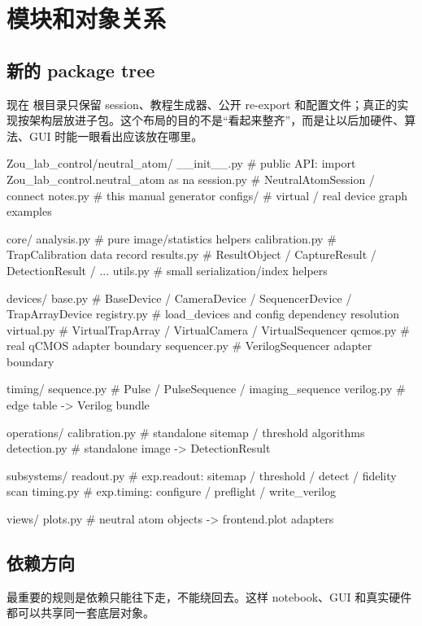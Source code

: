\documentclass[11pt,oneside,openany]{book}
\begin{document}
\chapter{模块和对象关系}
\section{新的 package tree}
现在  根目录只保留 session、教程生成器、公开 re-export 和配置文件；真正的实现按架构层放进子包。这个布局的目的不是“看起来整齐”，而是让以后加硬件、算法、GUI 时能一眼看出应该放在哪里。

\begin{codeblock}
Zou_lab_control/neutral_atom/
  __init__.py              # public API: import Zou_lab_control.neutral_atom as na
  session.py               # NeutralAtomSession / connect
  notes.py                 # this manual generator
  configs/                 # virtual / real device graph examples

  core/
    analysis.py            # pure image/statistics helpers
    calibration.py         # TrapCalibration data record
    results.py             # ResultObject / CaptureResult / DetectionResult / ...
    utils.py               # small serialization/index helpers

  devices/
    base.py                # BaseDevice / CameraDevice / SequencerDevice / TrapArrayDevice
    registry.py            # load_devices and config dependency resolution
    virtual.py             # VirtualTrapArray / VirtualCamera / VirtualSequencer
    qcmos.py               # real qCMOS adapter boundary
    sequencer.py           # VerilogSequencer adapter boundary

  timing/
    sequence.py            # Pulse / PulseSequence / imaging_sequence
    verilog.py             # edge table -> Verilog bundle

  operations/
    calibration.py         # standalone sitemap / threshold algorithms
    detection.py           # standalone image -> DetectionResult

  subsystems/
    readout.py             # exp.readout: sitemap / threshold / detect / fidelity scan
    timing.py              # exp.timing: configure / preflight / write_verilog

  views/
    plots.py               # neutral atom objects -> frontend.plot adapters
\end{codeblock}

\section{依赖方向}
最重要的规则是依赖只能往下走，不能绕回去。这样 notebook、GUI 和真实硬件都可以共享同一套底层对象。
\end{document}
